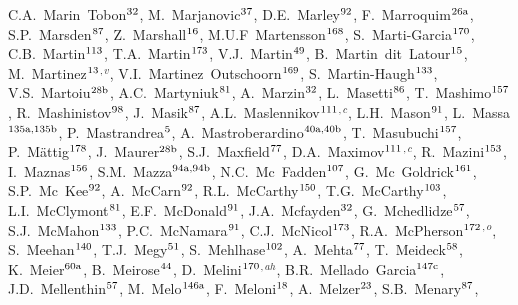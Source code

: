 \begin{flushleft}
C.A.~Marin~Tobon$^\textrm{\scriptsize 32}$,
M.~Marjanovic$^\textrm{\scriptsize 37}$,
D.E.~Marley$^\textrm{\scriptsize 92}$,
F.~Marroquim$^\textrm{\scriptsize 26a}$,
S.P.~Marsden$^\textrm{\scriptsize 87}$,
Z.~Marshall$^\textrm{\scriptsize 16}$,
M.U.F~Martensson$^\textrm{\scriptsize 168}$,
S.~Marti-Garcia$^\textrm{\scriptsize 170}$,
C.B.~Martin$^\textrm{\scriptsize 113}$,
T.A.~Martin$^\textrm{\scriptsize 173}$,
V.J.~Martin$^\textrm{\scriptsize 49}$,
B.~Martin~dit~Latour$^\textrm{\scriptsize 15}$,
M.~Martinez$^\textrm{\scriptsize 13}$$^{,v}$,
V.I.~Martinez~Outschoorn$^\textrm{\scriptsize 169}$,
S.~Martin-Haugh$^\textrm{\scriptsize 133}$,
V.S.~Martoiu$^\textrm{\scriptsize 28b}$,
A.C.~Martyniuk$^\textrm{\scriptsize 81}$,
A.~Marzin$^\textrm{\scriptsize 32}$,
L.~Masetti$^\textrm{\scriptsize 86}$,
T.~Mashimo$^\textrm{\scriptsize 157}$,
R.~Mashinistov$^\textrm{\scriptsize 98}$,
J.~Masik$^\textrm{\scriptsize 87}$,
A.L.~Maslennikov$^\textrm{\scriptsize 111}$$^{,c}$,
L.H.~Mason$^\textrm{\scriptsize 91}$,
L.~Massa$^\textrm{\scriptsize 135a,135b}$,
P.~Mastrandrea$^\textrm{\scriptsize 5}$,
A.~Mastroberardino$^\textrm{\scriptsize 40a,40b}$,
T.~Masubuchi$^\textrm{\scriptsize 157}$,
P.~M\"attig$^\textrm{\scriptsize 178}$,
J.~Maurer$^\textrm{\scriptsize 28b}$,
S.J.~Maxfield$^\textrm{\scriptsize 77}$,
D.A.~Maximov$^\textrm{\scriptsize 111}$$^{,c}$,
R.~Mazini$^\textrm{\scriptsize 153}$,
I.~Maznas$^\textrm{\scriptsize 156}$,
S.M.~Mazza$^\textrm{\scriptsize 94a,94b}$,
N.C.~Mc~Fadden$^\textrm{\scriptsize 107}$,
G.~Mc~Goldrick$^\textrm{\scriptsize 161}$,
S.P.~Mc~Kee$^\textrm{\scriptsize 92}$,
A.~McCarn$^\textrm{\scriptsize 92}$,
R.L.~McCarthy$^\textrm{\scriptsize 150}$,
T.G.~McCarthy$^\textrm{\scriptsize 103}$,
L.I.~McClymont$^\textrm{\scriptsize 81}$,
E.F.~McDonald$^\textrm{\scriptsize 91}$,
J.A.~Mcfayden$^\textrm{\scriptsize 32}$,
G.~Mchedlidze$^\textrm{\scriptsize 57}$,
S.J.~McMahon$^\textrm{\scriptsize 133}$,
P.C.~McNamara$^\textrm{\scriptsize 91}$,
C.J.~McNicol$^\textrm{\scriptsize 173}$,
R.A.~McPherson$^\textrm{\scriptsize 172}$$^{,o}$,
S.~Meehan$^\textrm{\scriptsize 140}$,
T.J.~Megy$^\textrm{\scriptsize 51}$,
S.~Mehlhase$^\textrm{\scriptsize 102}$,
A.~Mehta$^\textrm{\scriptsize 77}$,
T.~Meideck$^\textrm{\scriptsize 58}$,
K.~Meier$^\textrm{\scriptsize 60a}$,
B.~Meirose$^\textrm{\scriptsize 44}$,
D.~Melini$^\textrm{\scriptsize 170}$$^{,ah}$,
B.R.~Mellado~Garcia$^\textrm{\scriptsize 147c}$,
J.D.~Mellenthin$^\textrm{\scriptsize 57}$,
M.~Melo$^\textrm{\scriptsize 146a}$,
F.~Meloni$^\textrm{\scriptsize 18}$,
A.~Melzer$^\textrm{\scriptsize 23}$,
S.B.~Menary$^\textrm{\scriptsize 87}$,
$$
\end{flushleft}
